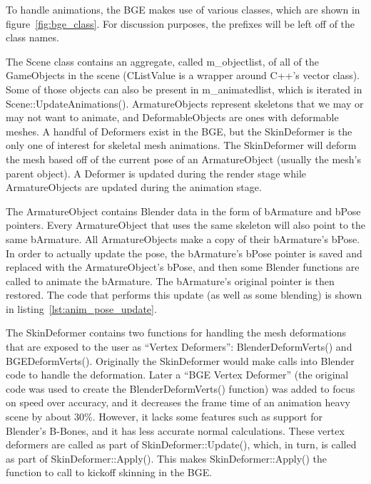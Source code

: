 To handle animations, the BGE makes use of various classes, which are shown in figure~\ref{fig:bge_class}.
For discussion purposes, the prefixes will be left off of the class names.


The Scene class contains an aggregate, called m\_objectlist, of all of the GameObjects in the scene (CListValue is a wrapper around C++'s vector class).
Some of those objects can also be present in m\_animatedlist, which is iterated in Scene::UpdateAnimations().
ArmatureObjects represent skeletons that we may or may not want to animate, and DeformableObjects are ones with deformable meshes.
A handful of Deformers exist in the BGE, but the SkinDeformer is the only one of interest for skeletal mesh animations.
The SkinDeformer will deform the mesh based off of the current pose of an ArmatureObject (usually the mesh's parent object).
A Deformer is updated during the render stage while ArmatureObjects are updated during the animation stage.

The ArmatureObject contains Blender data in the form of bArmature and bPose pointers.
Every ArmatureObject that uses the same skeleton will also point to the same bArmature.
All ArmatureObjects make a copy of their bArmature's bPose.
In order to actually update the pose, the bArmature's bPose pointer is saved and replaced with the ArmatureObject's bPose, and then some Blender functions are called to animate the bArmature.
The bArmature's original pointer is then restored.
The code that performs this update (as well as some blending) is shown in listing~\ref{lst:anim_pose_update}.


The SkinDeformer contains two functions for handling the mesh deformations that are exposed to the user as ``Vertex Deformers'': BlenderDeformVerts() and BGEDeformVerts().
Originally the SkinDeformer would make calls into Blender code to handle the deformation.
Later a ``BGE Vertex Deformer'' (the original code was used to create the BlenderDeformVerts() function) was added to focus on speed over accuracy, and it decreases the frame time of an animation heavy scene by about 30\%.
However, it lacks some features such as support for Blender's B-Bones, and it has less accurate normal calculations.
These vertex deformers are called as part of SkinDeformer::Update(), which, in turn, is called as part of SkinDeformer::Apply().
This makes SkinDeformer::Apply() the function to call to kickoff skinning in the BGE.


